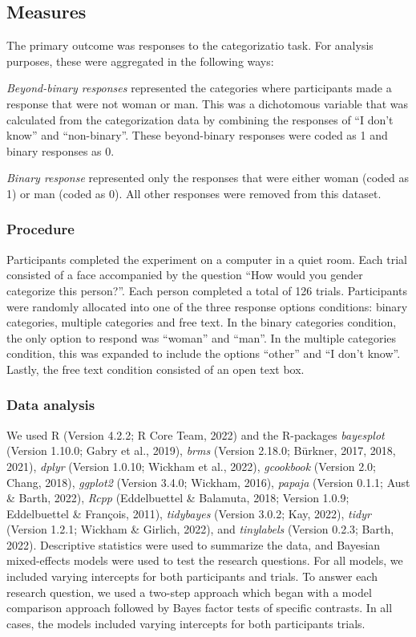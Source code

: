 \documentclass[
  man]{apa7}
\begin{document}
\hypertarget{measures}{%
\subsection{Measures}\label{measures}}

The primary outcome was responses to the categorizatio task. For analysis purposes, these were aggregated in the following ways:

\emph{Beyond-binary responses} represented the categories where participants made a response that were not woman or man. This was a dichotomous variable that was calculated from the categorization data by combining the responses of ``I don't know'' and ``non-binary''. These beyond-binary responses were coded as 1 and binary responses as 0.

\emph{Binary response} represented only the responses that were either woman (coded as 1) or man (coded as 0). All other responses were removed from this dataset.

\hypertarget{procedure}{%
\subsubsection{Procedure}\label{procedure}}

Participants completed the experiment on a computer in a quiet room. Each trial consisted of a face accompanied by the question ``How would you gender categorize this person?''. Each person completed a total of 126 trials. Participants were randomly allocated into one of the three response options conditions: binary categories, multiple categories and free text. In the binary categories condition, the only option to respond was ``woman'' and ``man''. In the multiple categories condition, this was expanded to include the options ``other'' and ``I don't know''. Lastly, the free text condition consisted of an open text box.

\hypertarget{data-analysis}{%
\subsubsection{Data analysis}\label{data-analysis}}

We used R (Version 4.2.2; R Core Team, 2022) and the R-packages \emph{bayesplot} (Version 1.10.0; Gabry et al., 2019), \emph{brms} (Version 2.18.0; Bürkner, 2017, 2018, 2021), \emph{dplyr} (Version 1.0.10; Wickham et al., 2022), \emph{gcookbook} (Version 2.0; Chang, 2018), \emph{ggplot2} (Version 3.4.0; Wickham, 2016), \emph{papaja} (Version 0.1.1; Aust \& Barth, 2022), \emph{Rcpp} (Eddelbuettel \& Balamuta, 2018; Version 1.0.9; Eddelbuettel \& François, 2011), \emph{tidybayes} (Version 3.0.2; Kay, 2022), \emph{tidyr} (Version 1.2.1; Wickham \& Girlich, 2022), and \emph{tinylabels} (Version 0.2.3; Barth, 2022). Descriptive statistics were used to summarize the data, and Bayesian mixed-effects models were used to test the research questions. For all models, we included varying intercepts for both participants and trials. To answer each research question, we used a two-step approach which began with a model comparison approach followed by Bayes factor tests of specific contrasts. In all cases, the models included varying intercepts for both participants trials.
\end{document}
